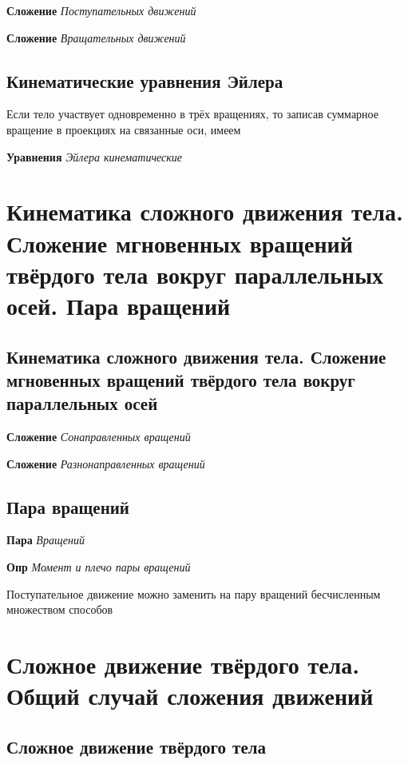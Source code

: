 \documentclass[a4paper, 14pt]{article}
\begin{document}
    \textbf{Сложение} \textit{Поступательных движений}
    
    \textbf{Сложение} \textit{Вращательных движений}
    
    \subsection{Кинематические уравнения Эйлера}
    
    Если тело участвует одновременно в трёх вращениях, то записав суммарное вращение в проекциях на связанные оси, имеем
    
    \textbf{Уравнения} \textit{Эйлера кинематические}
    
    \section{Кинематика сложного движения тела.
    Сложение мгновенных вращений твёрдого тела вокруг параллельных осей.
    Пара вращений}
    
    \subsection{Кинематика сложного движения тела. Сложение мгновенных вращений твёрдого тела вокруг параллельных осей}
    
    \textbf{Сложение} \textit{Сонаправленных вращений}
    
    \textbf{Сложение} \textit{Разнонаправленных вращений}
    
    \subsection{Пара вращений}
    
    \textbf{Пара} \textit{Вращений}
    
    \textbf{Опр} \textit{Момент и плечо пары вращений}
    
    Поступательное движение можно заменить на пару вращений бесчисленным множеством способов
    
    \section{Сложное движение твёрдого тела.
    Общий случай сложения движений}
    
    \subsection{Сложное движение твёрдого тела}
    
\end{document}
